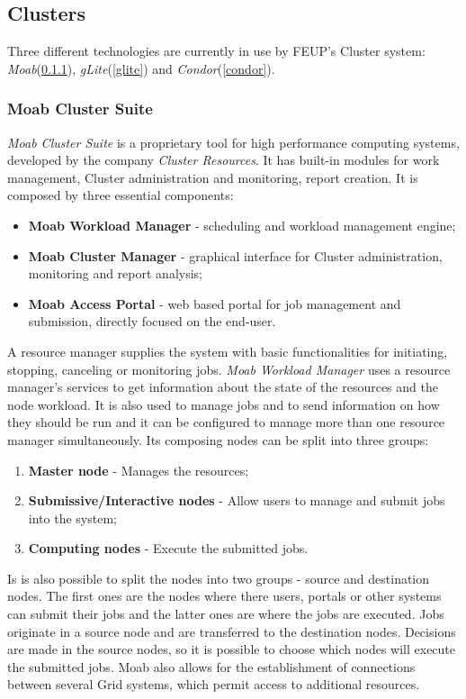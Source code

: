 \subsection{Clusters}\label{clusters}

Three different technologies are currently in use by FEUP's Cluster system: \textit{Moab}(\ref{moab}), \textit{gLite}(\ref{glite}) and \textit{Condor}(\ref{condor}).

\subsubsection{Moab Cluster Suite}\label{moab}

\textit{Moab Cluster Suite} is a proprietary tool for high performance computing systems, developed by the company \textit{Cluster Resources}. It has built-in modules for work management, Cluster administration and monitoring, report creation. It is composed by three essential components:
\begin{itemize}
\item \textbf{Moab Workload Manager} - scheduling and workload management engine;
\item \textbf{Moab Cluster Manager} - graphical interface for Cluster administration, monitoring and report analysis;
\item \textbf{Moab Access Portal} - web based portal for job management and submission, directly focused on the end-user.
\end{itemize}

A resource manager supplies the system with basic functionalities for initiating, stopping, canceling or monitoring jobs. \textit{Moab Workload Manager} uses a resource manager's services to get information about the state of the resources and the node workload. It is also used to manage jobs and to send information on how they should be run and it can be configured to manage more than one resource manager simultaneously.
Its composing nodes can be split into three groups:
\begin{enumerate}
\item \textbf{Master node} - Manages the resources;
\item \textbf{Submissive/Interactive nodes} - Allow users to manage and submit jobs into the system;
\item \textbf{Computing nodes} - Execute the submitted jobs.
\end{enumerate}

Is is also possible to split the nodes into two groups - source and destination nodes. The first ones are the nodes where there users, portals or other systems can submit their jobs and the latter ones are where the jobs are executed. Jobs originate in a source node and are transferred to the destination nodes. Decisions are made in the source nodes, so it is possible to choose which nodes will execute the submitted jobs.
Moab also allows for the establishment of connections between several Grid systems, which permit access to additional resources.\cite{jorge-ruao, moab}


